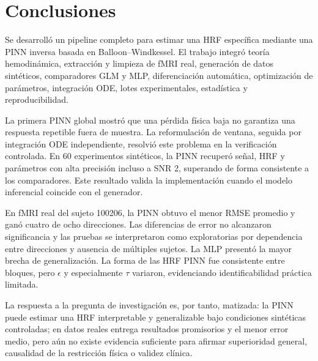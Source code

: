 \chapter{Conclusiones}

Se desarrolló un pipeline completo para estimar una HRF específica mediante una PINN inversa basada en Balloon--Windkessel. El trabajo integró teoría hemodinámica, extracción y limpieza de fMRI real, generación de datos sintéticos, comparadores GLM y MLP, diferenciación automática, optimización de parámetros, integración ODE, lotes experimentales, estadística y reproducibilidad.

La primera PINN global mostró que una pérdida física baja no garantiza una respuesta repetible fuera de muestra. La reformulación de ventana, seguida por integración ODE independiente, resolvió este problema en la verificación controlada. En 60 experimentos sintéticos, la PINN recuperó señal, HRF y parámetros con alta precisión incluso a SNR 2, superando de forma consistente a los comparadores. Este resultado valida la implementación cuando el modelo inferencial coincide con el generador.

En fMRI real del sujeto 100206, la PINN obtuvo el menor RMSE promedio y ganó cuatro de ocho direcciones. Las diferencias de error no alcanzaron significancia y las pruebas se interpretaron como exploratorias por dependencia entre direcciones y ausencia de múltiples sujetos. La MLP presentó la mayor brecha de generalización. La forma de las HRF PINN fue consistente entre bloques, pero $\epsilon$ y especialmente $\tau$ variaron, evidenciando identificabilidad práctica limitada.

La respuesta a la pregunta de investigación es, por tanto, matizada: la PINN puede estimar una HRF interpretable y generalizable bajo condiciones sintéticas controladas; en datos reales entrega resultados promisorios y el menor error medio, pero aún no existe evidencia suficiente para afirmar superioridad general, causalidad de la restricción física o validez clínica.

